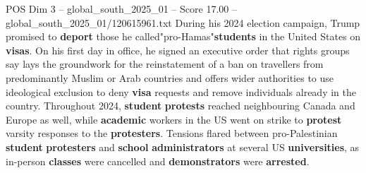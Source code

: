 \begin{textsample}{POS Dim 3 – global\_south\_2025\_01 – Score 17.00 – global\_south\_2025\_01/120615961.txt}
During his 2024 election campaign, Trump promised to \textbf{deport} those he called"pro-Hamas"\textbf{students} in the United States on \textbf{visas}.
On his first day in office, he signed an executive order that rights groups say lays the groundwork for the reinstatement of a ban on travellers from predominantly Muslim or Arab countries and offers wider authorities to use ideological exclusion to deny \textbf{visa} requests and remove individuals already in the country.
Throughout 2024, \textbf{student} \textbf{protests} reached neighbouring Canada and Europe as well, while \textbf{academic} workers in the US went on strike to \textbf{protest} varsity responses to the \textbf{protesters}.
Tensions flared between pro-Palestinian \textbf{student} \textbf{protesters} and \textbf{school} \textbf{administrators} at several US \textbf{universities}, as in-person \textbf{classes} were cancelled and \textbf{demonstrators} were \textbf{arrested}.

\end{textsample}
